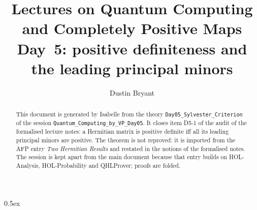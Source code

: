 \documentclass[11pt,a4paper]{article}
\theoremstyle{definition}
\begin{document}
\title{Lectures on Quantum Computing and Completely Positive Maps\\[0.5em]
  \large Day~5: positive definiteness and the leading principal minors}
\author{Dustin Bryant}
\maketitle

\begin{abstract}
This document is generated by Isabelle from the theory \texttt{Day05\_Sylvester\_Criterion}
of the session \texttt{Quantum\_Computing\_by\_VP\_Day05}.  It closes item D5-1 of the audit of the
formalised lecture notes: a Hermitian matrix is positive definite iff all its leading
principal minors are positive.  The theorem is not reproved: it is imported from the AFP
entry \emph{Two Hermitian Results} and restated in the notions of the formalised notes.
The session is kept apart from the main document because that entry builds on
HOL-Analysis, HOL-Probability and QHLProver; proofs are folded.
\end{abstract}

\parindent 0pt\parskip 0.5ex


\end{document}
